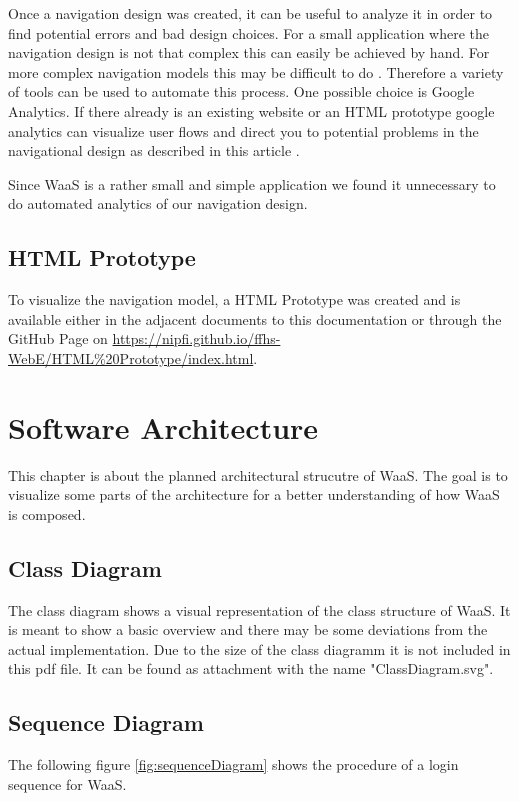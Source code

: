 \documentclass[titlepage, 12pt]{article}
\begin{document}
Once a navigation design was created, it can be useful to analyze it in order to find potential errors and bad design choices. For a small application where the navigation design is not that complex this can easily be achieved by hand. For more complex navigation models this may be difficult to do \cite{mSharonHurleyHall2019}. Therefore a variety of tools can be used to automate this process. One possible choice is Google Analytics. If there already is an existing website or an HTML prototype google analytics can visualize user flows and direct you to potential problems in the navigational design as described in this article \cite{mAndyCrestodina2018}.

Since WaaS is a rather small and simple application we found it unnecessary to do automated analytics of our navigation design.

\subsection{HTML Prototype}
To visualize the navigation model, a HTML Prototype was created and is available either in the adjacent documents to this documentation or through the GitHub Page on \url{https://nipfi.github.io/ffhs-WebE/HTML%20Prototype/index.html}.

\section{Software Architecture}
This chapter is about the planned architectural strucutre of WaaS. The goal is to visualize some parts of the architecture for a better understanding of how WaaS is composed.

\subsection{Class Diagram}
The class diagram shows a visual representation of the class structure of WaaS. It is meant to show a basic overview and there may be some deviations from the actual implementation. Due to the size of the class diagramm it is not included in this pdf file. It can be found as attachment with the name "ClassDiagram.svg".

\subsection{Sequence Diagram}
The following figure \ref{fig:sequenceDiagram} shows the procedure of a login sequence for WaaS.
\end{document}
